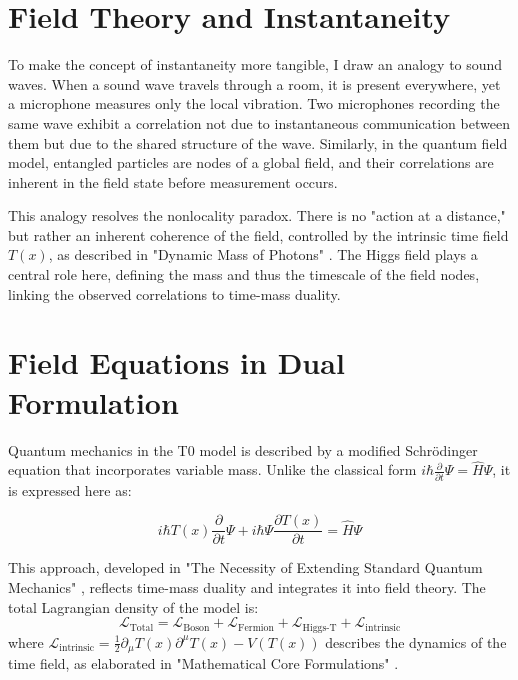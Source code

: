 \documentclass[a4paper,12pt]{article}
\newcommand{\Tfield}{T(x)}
\theoremstyle{definition}
\theoremstyle{remark}
\begin{document}
	\section{Field Theory and Instantaneity}
	
	To make the concept of instantaneity more tangible, I draw an analogy to sound waves. When a sound wave travels through a room, it is present everywhere, yet a microphone measures only the local vibration. Two microphones recording the same wave exhibit a correlation not due to instantaneous communication between them but due to the shared structure of the wave. Similarly, in the quantum field model, entangled particles are nodes of a global field, and their correlations are inherent in the field state before measurement occurs.
	
	This analogy resolves the nonlocality paradox. There is no "action at a distance," but rather an inherent coherence of the field, controlled by the intrinsic time field \(\Tfield\), as described in "Dynamic Mass of Photons" \cite{pascher_photons_2025}. The Higgs field plays a central role here, defining the mass and thus the timescale of the field nodes, linking the observed correlations to time-mass duality.
	
	\section{Field Equations in Dual Formulation}
	
	Quantum mechanics in the T0 model is described by a modified Schrödinger equation that incorporates variable mass. Unlike the classical form \(i\hbar \frac{\partial}{\partial t} \Psi = \hat{H} \Psi\), it is expressed here as:
	
	\begin{equation}
		i\hbar \Tfield \frac{\partial}{\partial t} \Psi + i\hbar \Psi \frac{\partial \Tfield}{\partial t} = \hat{H} \Psi
	\end{equation}
	
	This approach, developed in "The Necessity of Extending Standard Quantum Mechanics" \cite{pascher_quantum_2025}, reflects time-mass duality and integrates it into field theory. The total Lagrangian density of the model is:
	\begin{equation}
		\mathcal{L}_{\text{Total}} = \mathcal{L}_{\text{Boson}} + \mathcal{L}_{\text{Fermion}} + \mathcal{L}_{\text{Higgs-T}} + \mathcal{L}_{\text{intrinsic}}
	\end{equation}
	where \(\mathcal{L}_{\text{intrinsic}} = \frac{1}{2} \partial_\mu \Tfield \partial^\mu \Tfield - V(\Tfield)\) describes the dynamics of the time field, as elaborated in "Mathematical Core Formulations" \cite{pascher_lagrange_2025}.
	
\end{document}
